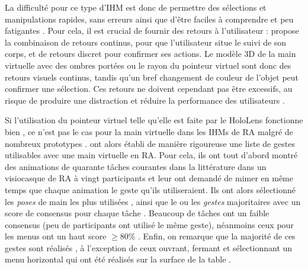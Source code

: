 La difficulté pour ce type d'IHM est donc de permettre des sélections et manipulations rapides, sans erreurs ainsi que d'être faciles à comprendre et peu fatigantes \citep{Argelaguet2013}. Pour cela, il est crucial de fournir des retours à l'utilisateur : \cite{Chan2010} propose la combinaison de retours continus, pour que l'utilisateur situe le suivi de son corps, et de retours discret pour confirmer ses actions. Le modèle 3D de la main virtuelle avec des ombres portées ou le rayon du pointeur virtuel sont donc des retours visuels continus, tandis qu'un bref changement de couleur de l'objet peut confirmer une sélection. Ces retours ne doivent cependant pas être excessifs, au risque de produire une distraction et réduire la performance des utilisateurs \citep{Argelaguet2013}.



Si l'utilisation du pointeur virtuel telle qu'elle est faite par le HoloLens fonctionne bien \citep{Kitoe2018}, ce n'est pas le cas pour la main virtuelle dans les IHMs de RA malgré de nombreux prototypes \citep{Piumsomboon2013}. \citeauthor{Piumsomboon2013} ont alors établi de manière rigoureuse une liste de gestes utilisables avec une main virtuelle en RA. Pour cela, ils ont tout d'abord montré des animations de quarante tâches courantes dans la littérature dans un visiocasque de RA à vingt participants et leur ont demandé de mimer en même temps que chaque animation le geste qu'ils utiliseraient. Ils ont alors sélectionné les \emph{poses} de main les plus utilisées , ainsi que le ou les \emph{gestes} majoritaires avec un score de consensus pour chaque tâche . Beaucoup de tâches ont un faible consensus (peu de participants ont utilisé le même geste), néanmoins ceux pour les menus ont un haut score $\geq 80\%$ . Enfin, on remarque que la majorité de ces gestes sont réalisés , à l'exception de ceux ouvrant, fermant et sélectionnant un menu horizontal qui ont été réalisés sur la surface de la table .

